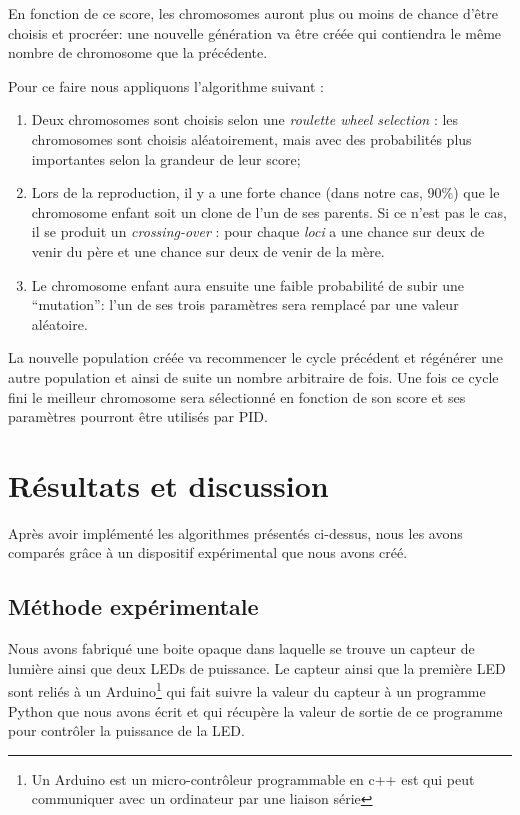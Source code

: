 \documentclass[a4paper,10pt]{report}
\begin{document}
En fonction de ce score, les chromosomes auront plus ou moins de chance d'être choisis et procréer: une nouvelle génération va être créée qui contiendra le même nombre de chromosome que la précédente.

Pour ce faire nous appliquons l'algorithme suivant :
\begin{enumerate}
  \item Deux chromosomes sont choisis selon une \textit{roulette wheel selection} : les chromosomes sont choisis aléatoirement, mais avec des probabilités plus importantes selon la grandeur de leur score;
  \item Lors de la reproduction, il y a une forte chance (dans notre cas, 90\%) que le chromosome enfant soit un clone de l'un de ses parents. Si ce n'est pas le cas, il se produit un \textit{crossing-over} : pour chaque \textit{loci} a une chance sur deux de venir du père et une chance sur deux de venir de la mère.
  \item Le chromosome enfant aura ensuite une faible probabilité de subir une ``mutation'': l'un de ses trois paramètres sera remplacé par une valeur aléatoire.
\end{enumerate}

La nouvelle population créée va recommencer le cycle précédent et régénérer une autre population et ainsi de suite un nombre arbitraire de fois.
Une fois ce cycle fini le meilleur chromosome sera sélectionné en fonction de son score et ses paramètres pourront être utilisés par PID.


\chapter{Résultats et discussion}

Après avoir implémenté les algorithmes présentés ci-dessus, nous les avons comparés grâce à un dispositif expérimental que nous avons créé.

\section{Méthode expérimentale}
\label{sec:methode}
Nous avons fabriqué une boite opaque dans laquelle se trouve un capteur de lumière ainsi que deux LEDs de puissance. Le capteur ainsi que la première LED sont reliés à un Arduino\footnote{Un Arduino est un micro-contrôleur programmable en c++ est qui peut communiquer avec un ordinateur par une liaison série} qui fait suivre la valeur du capteur à un programme Python que nous avons écrit et qui récupère la valeur de sortie de ce programme pour contrôler la puissance de la LED.
\end{document}
